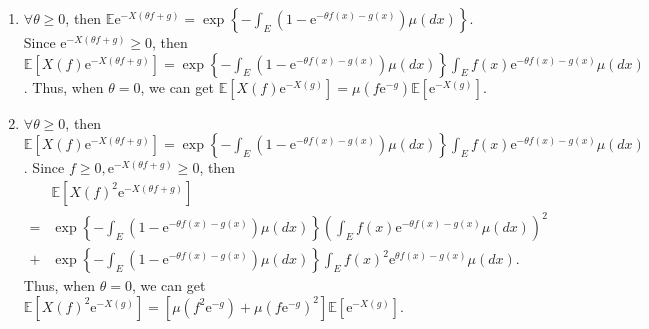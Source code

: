\documentclass{ctexart}
\begin{document}
\begin{enumerate}
  \item \(\forall \theta \geq 0\), then \(\mathbb{E}\mathrm{e}^{-X(\theta f + g)}=\exp\left\{-\int_{E}(1-\mathrm{e}^{-\theta f(x)-g(x)})\mu(dx)\right\}\).
    Since \(\mathrm{e}^{-X(\theta f + g)} \geq 0\), then \(\mathbb{E}[X(f)\mathrm{e}^{-X(\theta f + g)}] = \exp \left\{-\int_{E}(1-\mathrm{e}^{-\theta f(x)-g(x)})\mu(d x)\right\}\int_{E} f(x)\mathrm{e}^{-\theta f(x)-g(x)}\mu(dx)\).
    Thus, when \(\theta =0\), we can get \(\mathbb{E}[X(f)\mathrm{e}^{-X(g)}]=\mu(f \mathrm{e}^{-g})\mathbb{E}[\mathrm{e}^{-X(g)}]\).
  \item \(\forall \theta \geq 0\), then \(\mathbb{E}[X(f)\mathrm{e}^{-X(\theta f + g)}] = \exp \left\{-\int_{E}(1-\mathrm{e}^{-\theta f(x)-g(x)})\mu(d x)\right\}\int_{E} f(x)\mathrm{e}^{-\theta f(x)-g(x)}\mu(dx)\).
    Since \(f \geq 0, \mathrm{e}^{-X(\theta f + g)} \geq 0\), then
    \[
      \begin{aligned}
          & \mathbb{E}[X(f)^2\mathrm{e}^{-X(\theta f + g)}]                                                                                \\
        = & \exp \left\{-\int_{E}(1-\mathrm{e}^{-\theta f(x)-g(x)})\mu(d x)\right\}(\int_{E} f(x)\mathrm{e}^{-\theta f(x)-g(x)}\mu(dx))^2  \\
        + & \exp\left\{-\int_{E}(1-\mathrm{e}^{-\theta f(x)-g(x)})\mu (d x)\right\} \int_{E}f(x)^2\mathrm{e}^{\theta f(x)-g(x)} \mu (dx) .
      \end{aligned}
    \]
    Thus, when \(\theta =0\), we can get \(\mathbb{E}[X(f)^2\mathrm{e}^{-X(g)}]=[\mu(f^2 \mathrm{e}^{-g}) + \mu(f \mathrm{e}^{-g})^2]\mathbb{E}[\mathrm{e}^{-X(g)}]\).
\end{enumerate}
\end{document}

